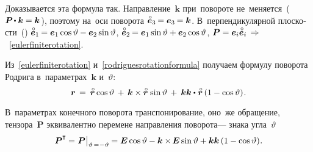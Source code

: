 \begin{otherlanguage}{russian}
\vspace{-0.1em} Доказывается эта формула так. Направление~${\bm{k}}$ при~повороте не~меняется~(${\bm{P} \hspace{-0.2ex}\dotp \bm{k} = \bm{k}\hspace{0.12ex}}$), поэтому на~оси поворота ${\mathcircabove{\bm{e}}_3 \hspace{-0.16ex} = \bm{e}_3 \hspace{-0.16ex} = \bm{k}}$. В~перпендикулярной плоскости~() ${\mathcircabove{\bm{e}}_1 \hspace{-0.16ex} = \bm{e}_1 \operatorname{cos} \vartheta - \bm{e}_2 \operatorname{sin} \vartheta}$, ${\mathcircabove{\bm{e}}_2 \hspace{-0.16ex} = \bm{e}_1 \operatorname{sin} \vartheta + \bm{e}_2 \operatorname{cos} \vartheta}$, ${\bm{P} = \bm{e}_i \mathcircabove{\bm{e}}_i \,\Rightarrow\hspace{.2ex}}$~\eqref{eulerfiniterotation}.



Из~\eqref{eulerfiniterotation} и~\eqref{rodriguesrotationformula} получаем формулу поворота Родрига в~параметрах~$\bm{k}$ и~$\vartheta$:
\nopagebreak\vspace{-0.2em}\begin{equation*}
\bm{r} \hspace{0.4ex}=\hspace{0.5ex} \mathcircabove{\bm{r}} \operatorname{cos} \vartheta \hspace{0.4ex}+\hspace{0.4ex} \bm{k} \times \mathcircabove{\bm{r}} \hspace{0.2ex} \operatorname{sin} \vartheta \hspace{0.4ex}+\hspace{0.5ex} \bm{k} \bm{k} \dotp\hspace{0.1ex} \mathcircabove{\bm{r}} \left({1 - \operatorname{cos} \vartheta}\right) \hspace{-0.25ex}.
\end{equation*}

\vspace{-0.16em} В~параметрах конечного поворота транспонирование, оно~же обращение, тензора~$\bm{P}$ эквивалентно перемене направления поворота\:--- знака угла~$\vartheta$
\[
\bm{P}^{\T} \hspace{-0.1ex}=\hspace{0.1ex} \bm{P} \hspace{0.1ex} \bigr|_{\vartheta \,=\hspace{0.1ex} -\vartheta} \hspace{-0.1ex} = \bm{E} \operatorname{cos} \vartheta - \bm{k} \times\hspace{-0.2ex} \bm{E} \operatorname{sin} \vartheta + \bm{k} \bm{k} \left({1 - \operatorname{cos} \vartheta}\right) \hspace{-0.32ex}.
\]


\end{otherlanguage}
